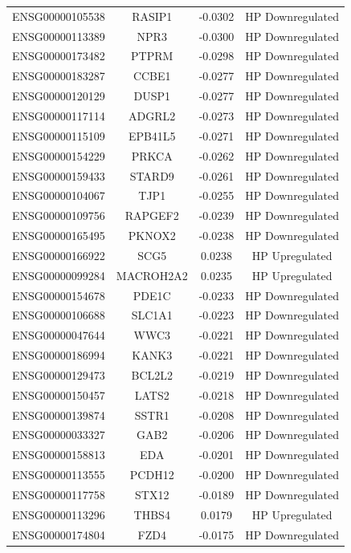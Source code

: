 \documentclass[
]{article}
\begin{document}
\begin{singlespace}
\begin{longtable}[t]{lccc}
\addlinespace
ENSG00000105538 & RASIP1 & -0.0302 & HP Downregulated\\
ENSG00000113389 & NPR3 & -0.0300 & HP Downregulated\\
ENSG00000173482 & PTPRM & -0.0298 & HP Downregulated\\
ENSG00000183287 & CCBE1 & -0.0277 & HP Downregulated\\
ENSG00000120129 & DUSP1 & -0.0277 & HP Downregulated\\
\addlinespace
ENSG00000117114 & ADGRL2 & -0.0273 & HP Downregulated\\
ENSG00000115109 & EPB41L5 & -0.0271 & HP Downregulated\\
ENSG00000154229 & PRKCA & -0.0262 & HP Downregulated\\
ENSG00000159433 & STARD9 & -0.0261 & HP Downregulated\\
ENSG00000104067 & TJP1 & -0.0255 & HP Downregulated\\
\addlinespace
ENSG00000109756 & RAPGEF2 & -0.0239 & HP Downregulated\\
ENSG00000165495 & PKNOX2 & -0.0238 & HP Downregulated\\
ENSG00000166922 & SCG5 & 0.0238 & HP Upregulated\\
ENSG00000099284 & MACROH2A2 & 0.0235 & HP Upregulated\\
ENSG00000154678 & PDE1C & -0.0233 & HP Downregulated\\
\addlinespace
ENSG00000106688 & SLC1A1 & -0.0223 & HP Downregulated\\
ENSG00000047644 & WWC3 & -0.0221 & HP Downregulated\\
ENSG00000186994 & KANK3 & -0.0221 & HP Downregulated\\
ENSG00000129473 & BCL2L2 & -0.0219 & HP Downregulated\\
ENSG00000150457 & LATS2 & -0.0218 & HP Downregulated\\
\addlinespace
ENSG00000139874 & SSTR1 & -0.0208 & HP Downregulated\\
ENSG00000033327 & GAB2 & -0.0206 & HP Downregulated\\
ENSG00000158813 & EDA & -0.0201 & HP Downregulated\\
ENSG00000113555 & PCDH12 & -0.0200 & HP Downregulated\\
ENSG00000117758 & STX12 & -0.0189 & HP Downregulated\\
\addlinespace
ENSG00000113296 & THBS4 & 0.0179 & HP Upregulated\\
ENSG00000174804 & FZD4 & -0.0175 & HP Downregulated\\

\end{longtable}
\end{singlespace}
\end{document}
